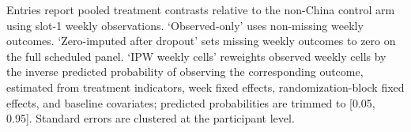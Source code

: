 \begin{table}[H]
\begin{threeparttable}
\begin{tabular}{lllcccc}
\end{tabular}
\begin{tablenotes}[flushleft]
\footnotesize
\item Entries report pooled treatment contrasts relative to the non-China control arm using slot-1 weekly observations. `Observed-only' uses non-missing weekly outcomes. `Zero-imputed after dropout' sets missing weekly outcomes to zero on the full scheduled panel. `IPW weekly cells' reweights observed weekly cells by the inverse predicted probability of observing the corresponding outcome, estimated from treatment indicators, week fixed effects, randomization-block fixed effects, and baseline covariates; predicted probabilities are trimmed to [0.05, 0.95]. Standard errors are clustered at the participant level.
\end{tablenotes}
\end{threeparttable}
\end{table}
